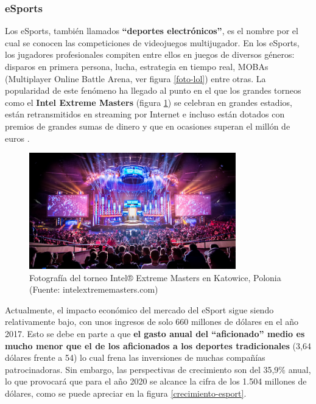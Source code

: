 \subsubsection{eSports}
Los eSports, también llamados \textbf{``deportes electrónicos''}, es el nombre por el cual se conocen las competiciones de videojuegos multijugador. En los eSports, los jugadores profesionales compiten entre ellos en juegos de diversos géneros: disparos en primera persona, lucha, estrategia en tiempo real, MOBAs (Multiplayer Online Battle Arena, ver figura \ref{foto-lol}) entre otras. La popularidad de este fenómeno ha llegado al punto en el que los grandes torneos como el \textbf{Intel Extreme Masters} (figura \ref{foto-torneo-esport}) se celebran en grandes estadios, están retransmitidos en streaming por Internet e incluso están dotados con premios de grandes sumas de dinero y que en ocasiones superan el millón de euros \cite{libro_blanco}.

\begin{figure}[h]
    \centering
    \includegraphics[width=0.8\textwidth]{images/estadodelarte/mercado/foto-torneo-esport}
    \caption{Fotografía del torneo Intel® Extreme Masters en Katowice, Polonia (Fuente: intelextrememasters.com)}
    \label{foto-torneo-esport}
\end{figure}

Actualmente, el impacto económico del mercado del eSport sigue siendo relativamente bajo, con unos ingresos de solo 660 millones de dólares en el año 2017. Esto se debe en parte a que \textbf{el gasto anual del ``aficionado'' medio es mucho menor que el de los aficionados a los deportes tradicionales} (3,64 dólares frente a 54) lo cual frena las inversiones de muchas compañías patrocinadoras. Sin embargo, las perspectivas de crecimiento son del 35,9\% anual, lo que provocará que para el año 2020 se alcance la cifra de los 1.504 millones de dólares, como se puede apreciar en la figura \ref{crecimiento-esport}.

